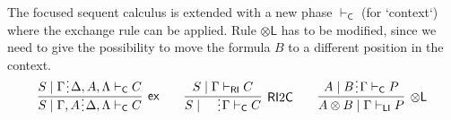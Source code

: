 \documentclass[submission,copyright,creativecommons]{eptcs}
\theoremstyle{definition}
\newcommand{\tl}{\otimes \mathsf{L}}
\newcommand{\tr}{\otimes \mathsf{R}}
\newcommand{\pass}{\mathsf{pass}}
\newcommand{\unitl}{\mathsf{IL}}
\newcommand{\unitr}{\mathsf{IR}}
\newcommand{\andlone}{\land \mathsf{L}_{1}}
\newcommand{\andltwo}{\land \mathsf{L}_{2}}
\newcommand{\andr}{\land \mathsf{R}}
\newcommand{\orl}{\lor \mathsf{L}}
\newcommand{\orrone}{\lor \mathsf{R}_{1}}
\newcommand{\orrtwo}{\lor \mathsf{R}_{2}}
\newcommand{\ax}{\mathsf{ax}}
\newcommand{\ot}{\otimes}
\newcommand{\I}{\mathsf{I}}
\newcommand{\C}{\mathsf{C}}
\newcommand{\RI}{\mathsf{RI}}
\newcommand{\LI}{\mathsf{LI}}
\newcommand{\F}{\mathsf{F}}
\newcommand{\tP}{\mathbb{P}}
\newcommand{\tCone}{\mathbb{C}_1}
\newcommand{\tCtwo}{\mathbb{C}_2}
\newcommand{\tE}{\mathbb{R}}
\newcommand{\ex}{\mathsf{ex}}
\newcommand{\spl}{\raisebox{-1.5pt}[0.5\height]{\hspace{1pt}\vdots\hspace{1pt}}}
\newcommand{\proofbox}[1]{\begin{tabular}{l} #1 \end{tabular}}
\begin{document}
The focused sequent calculus is extended with a new phase $\vdash_\C$ (for `context`) where the exchange rule can be applied. Rule $\tl$ has to be modified, since we need to give the possibility to move the formula $B$ to a different position in the context.
\begin{equation*}\label{eq:focus:sym}
  \begin{array}{c}
      \infer[\ex]{S \mid \Gamma , A \spl \Delta , \Lambda \vdash_{\C} C}{S \mid \Gamma \spl \Delta , A , \Lambda \vdash_{\C} C}
      \qquad
      \infer[\RI 2 \C]{S \mid \quad \spl \Gamma \vdash_{\C} C}{S \mid \Gamma \vdash_{\RI} C}
    \qquad
    \infer[\tl]{A \ot B \mid \Gamma \vdash_{\LI} P}{A \mid B \spl \Gamma \vdash_{\C} P}
  \end{array}
\end{equation*}
\end{document}
